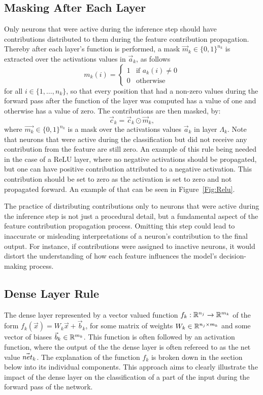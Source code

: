 \subsection{Masking After Each Layer}
Only neurons that were active during the inference step should have contributions distributed to them during the feature contribution propagation. Thereby after each layer's function is performed, a mask $\vec{m}_k\in \{0,1\}^{n_k}$ is extracted over the activations values in $\vec{a}_k$, as follows 
\begin{equation*}
    \label{eq:masking}
    m_k(i) = \begin{cases}
    1 & \mbox{if $a_k(i)\not=0$}\\
    0 & \mbox{otherwise}
    \end{cases} 
\end{equation*}
for all $i \in \{1,\dots, n_k\}$, so that every position that had a non-zero values during the forward pass after the function of the layer was computed has a value of one and otherwise has a value of zero. The contributions are then masked, by:
    \begin{equation*}
    \label{masking}
        \vec{c}_k = \vec{c}_k\odot \vec{m}_k,
    \end{equation*}
where $\vec{m_k}\in \{0,1\}^{n_k}$ is a mask over the activations values $\vec{a}_k$ in layer $\Lambda_k$. Note that neurons that were active during the classification but did not receive any contribution from the feature are still zero. An example of this rule being needed in the case of a ReLU layer, where no negative activations should be propagated, but one can have positive contribution attributed to a negative activation. This contribution should be set to zero as the activation is set to zero and not propagated forward. An example of that can be seen in Figure~\ref{Fig:Relu}.

The practice of distributing contributions only to neurons that were active during the inference step is not just a procedural detail, but a fundamental aspect of the feature contribution propagation process. Omitting this step could lead to inaccurate or misleading interpretations of a neuron's contribution to the final output. For instance, if contributions were assigned to inactive neurons, it would distort the understanding of how each feature influences the model's decision-making process.


\subsection{Dense Layer Rule}
The dense layer represented by a vector valued function $f_k: \mathbb{R}^{n_j}\to \mathbb{R}^{m_k}$ of the form $f_k(\vec{x})= W_k \vec{x} + \vec{b}_k$, for some matrix of weights $W_k \in \mathbb{R}^{n_j\times m_k}$ and some vector of biases $\vec{b}_k \in \mathbb{R}^{m_k}$. This function is often followed by an activation function, where the output of the the dense layer is often refereed to as the net value $\vec{net}_{k}$. The explanation of the function $f_k$ is broken down in the section below into its individual components. This approach aims to clearly illustrate the impact of the dense layer on the classification of a part of the input during the forward pass of the network.

